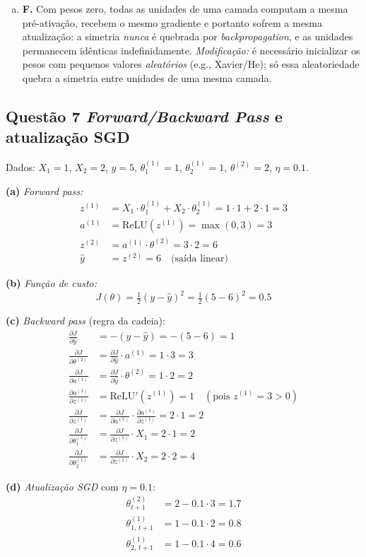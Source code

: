 \documentclass[11pt,a4paper]{article}
\begin{document}
\begin{enumerate}[a)]
    \item \textbf{F.} Com pesos zero, todas as unidades de uma camada computam a mesma pré-ativação, recebem o mesmo gradiente e portanto sofrem a mesma atualização: a simetria \emph{nunca} é quebrada por \textit{backpropagation}, e as unidades permanecem idênticas indefinidamente. \textit{Modificação:} é necessário inicializar os pesos com pequenos valores \emph{aleatórios} (e.g., Xavier/He); só essa aleatoriedade quebra a simetria entre unidades de uma mesma camada.
\end{enumerate}

\subsection*{Questão 7 \textemdash{} \textit{Forward/Backward Pass} e atualização SGD}

Dados: $X_1 = 1$, $X_2 = 2$, $y = 5$, $\theta^{(1)}_1 = 1$, $\theta^{(1)}_2 = 1$, $\theta^{(2)} = 2$, $\eta = 0.1$.

\textbf{(a)} \textit{Forward pass:}
\begin{align*}
    z^{(1)} &= X_1 \cdot \theta^{(1)}_1 + X_2 \cdot \theta^{(1)}_2 = 1 \cdot 1 + 2 \cdot 1 = 3 \\
    a^{(1)} &= \mathrm{ReLU}(z^{(1)}) = \max(0, 3) = 3 \\
    z^{(2)} &= a^{(1)} \cdot \theta^{(2)} = 3 \cdot 2 = 6 \\
    \hat{y} &= z^{(2)} = 6 \quad \text{(saída linear)}
\end{align*}

\textbf{(b)} \textit{Função de custo:}
\[
J(\theta) = \tfrac{1}{2}(y - \hat{y})^2 = \tfrac{1}{2}(5 - 6)^2 = 0.5
\]

\textbf{(c)} \textit{Backward pass} (regra da cadeia):
\begin{align*}
    \frac{\partial J}{\partial \hat{y}} &= -(y - \hat{y}) = -(5 - 6) = 1 \\
    \frac{\partial J}{\partial \theta^{(2)}} &= \frac{\partial J}{\partial \hat{y}} \cdot a^{(1)} = 1 \cdot 3 = 3 \\
    \frac{\partial J}{\partial a^{(1)}} &= \frac{\partial J}{\partial \hat{y}} \cdot \theta^{(2)} = 1 \cdot 2 = 2 \\
    \frac{\partial a^{(1)}}{\partial z^{(1)}} &= \mathrm{ReLU}'(z^{(1)}) = 1 \quad (\text{pois } z^{(1)} = 3 > 0) \\
    \frac{\partial J}{\partial z^{(1)}} &= \frac{\partial J}{\partial a^{(1)}} \cdot \frac{\partial a^{(1)}}{\partial z^{(1)}} = 2 \cdot 1 = 2 \\
    \frac{\partial J}{\partial \theta^{(1)}_1} &= \frac{\partial J}{\partial z^{(1)}} \cdot X_1 = 2 \cdot 1 = 2 \\
    \frac{\partial J}{\partial \theta^{(1)}_2} &= \frac{\partial J}{\partial z^{(1)}} \cdot X_2 = 2 \cdot 2 = 4
\end{align*}

\textbf{(d)} \textit{Atualização SGD} com $\eta = 0.1$:
\begin{align*}
    \theta^{(2)}_{t+1}      &= 2 - 0.1 \cdot 3 = 1.7 \\
    \theta^{(1)}_{1,\,t+1}  &= 1 - 0.1 \cdot 2 = 0.8 \\
    \theta^{(1)}_{2,\,t+1}  &= 1 - 0.1 \cdot 4 = 0.6
\end{align*}

\color{black}
\end{document}
